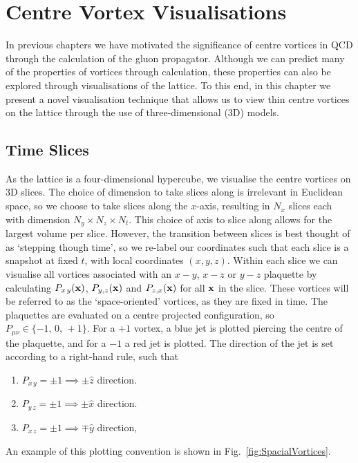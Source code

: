 
\chapter{Centre Vortex Visualisations}
\ifpdf
    \graphicspath{{Chapter7/Figs/Raster/}{Chapter7/Figs/PDF/}{Chapter7/Figs/}}
\else
    \graphicspath{{Chapter7/Figs/Vector/}{Chapter7/Figs/}}
\fi

In previous chapters we have motivated the significance of centre vortices in QCD through the calculation of the gluon propagator. Although we can predict many of the properties of vortices through calculation, these properties can also be explored through visualisations of the lattice. To this end, in this chapter we present a novel visualisation technique that allows us to view thin centre vortices on the lattice through the use of three-dimensional (3D) models.

\section{Time Slices}
As the lattice is a four-dimensional hypercube, we visualise the centre vortices on 3D slices. The choice of dimension to take slices along is irrelevant in Euclidean space, so we choose to take slices along the $x$-axis, resulting in $N_x$ slices each with dimension $N_y\times N_z\times N_t$. This choice of axis to slice along allows for the largest volume per slice.  However, the transition between slices is best thought of as `stepping though time', so we re-label our coordinates such that each slice is a snapshot at fixed $t$, with local coordinates $(x,y,z)$. Within each slice we can visualise all vortices associated with an $x-y$, $x-z$ or $y-z$ plaquette by calculating $P_{x\,y}(\bf{x})$, $P_{y,z}(\bf{x})$ and $P_{z,x}(\bf{x})$ for all $\bf{x}$ in the slice. These vortices will be referred to as the `space-oriented' vortices, as they are fixed in time. The plaquettes are evaluated on a centre projected configuration, so $P_{\mu\nu}\in \lbrace -1,\,0,\,+1\rbrace$. For a $+1$ vortex, a blue jet is plotted piercing the centre of the plaquette, and for a $-1$ a red jet is plotted. The direction of the jet is set according to a right-hand rule, such that
\begin{enumerate}
\item $P_{x\,y}=\pm 1\implies \pm\hat{z}$ direction.
\item $P_{y\,z}=\pm 1\implies \pm\hat{x}$ direction.
\item $P_{x\,z}=\pm 1\implies \mp\hat{y}$ direction,
\end{enumerate}
An example of this plotting convention is shown in Fig.~\ref{fig:SpacialVortices}.\\

